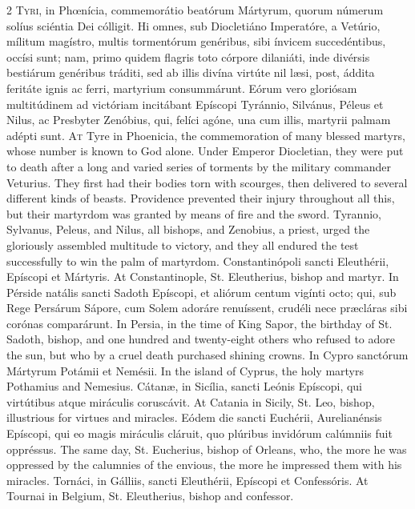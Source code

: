 \begin{paracol}{2}
\lettrine[lines=2]{T}{yri,} in Phœnícia, commemorátio beatórum 
 Mártyrum, quorum númerum solíus sciéntia Dei cólligit. Hi omnes, sub 
 Diocletiáno Imperatóre, a Vetúrio, mílitum magístro, multis tormentórum 
 genéribus, sibi ínvicem succedéntibus, occísi sunt; nam, primo quidem 
 flagris toto córpore dilaniáti, inde divérsis bestiárum genéribus tráditi, 
 sed ab illis divína virtúte nil læsi, post, áddita feritáte ignis ac ferri, 
 martyrium consummárunt. Eórum vero gloriósam multitúdinem ad victóriam 
 incitábant Epíscopi Tyránnio, Silvánus, Péleus et Nilus, ac Presbyter 
 Zenóbius, qui, felíci agóne, una cum illis, martyrii palmam adépti sunt.
\switchcolumn
{}
\lettrine[lines=2]{A}{t} Tyre in Phoenicia, the commemoration of many blessed martyrs, whose 
 number is known to God alone. Under Emperor Diocletian, they were put 
 to death after a long and varied series of torments by the military 
 commander Veturius. They first had their bodies torn with scourges, 
 then delivered to several different kinds of beasts. Providence 
 prevented their injury throughout all this, but their martyrdom was granted 
 by means of fire and the sword. Tyrannio, Sylvanus, Peleus, and Nilus, 
 all bishops, and Zenobius, a priest, urged the gloriously assembled 
 multitude to victory, and they all endured the test successfully to win the 
 palm of martyrdom.
\switchcolumn*
{}
Constantinópoli sancti Eleuthérii, Epíscopi et Mártyris.
\switchcolumn
{}
At Constantinople, St. Eleutherius, bishop and martyr.
\switchcolumn*
{}
In Pérside natális sancti Sadoth Epíscopi, et aliórum centum vigínti octo; 
 qui, sub Rege Persárum Sápore, cum Solem 
 adoráre renuíssent, crudéli nece præcláras sibi corónas comparárunt.
\switchcolumn
{}
In Persia, in the time of King Sapor, the birthday of St. Sadoth, bishop, 
 and one hundred and twenty-eight others who refused to adore the sun, but 
 who by a cruel death purchased shining crowns.
\switchcolumn*
{}
In Cypro sanctórum Mártyrum Potámii et Nemésii.
\switchcolumn
{}
In the island of Cyprus, the holy martyrs Pothamius and Nemesius.
\switchcolumn*
{}
Cátanæ, in Sicília, sancti Leónis Epíscopi, qui 
 virtútibus atque miráculis coruscávit.
\switchcolumn
{}
At Catania in Sicily, St. Leo, bishop, illustrious for virtues and miracles.
\switchcolumn*
{}
Eódem die sancti Euchérii, Aurelianénsis Epíscopi, qui eo magis miráculis 
 cláruit, quo plúribus invidórum calúmniis fuit oppréssus.
\switchcolumn
{}
The same day, St. Eucherius, bishop of Orleans, who, the more he was 
 oppressed by the calumnies of the envious, the more he impressed them with 
 his miracles.
\switchcolumn*
{}
Tornáci, in Gálliis, sancti Eleuthérii, Epíscopi et Confessóris.
\switchcolumn
{}
At Tournai in Belgium, St. Eleutherius, bishop and confessor.
\switchcolumn*
{}
\end{paracol}



